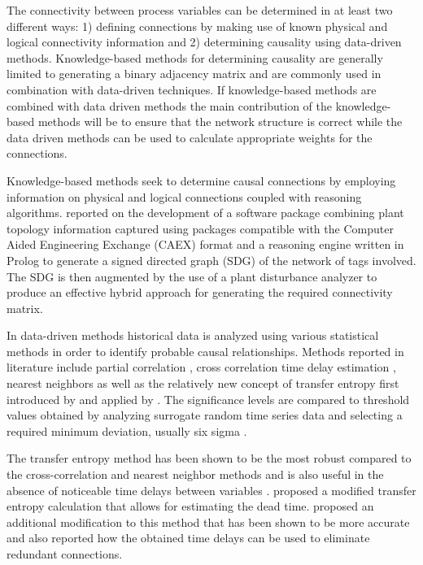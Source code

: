 \documentclass{article}
\begin{document}
The connectivity between process variables can be determined in at least two different ways: 1) defining connections by making use of known physical and logical connectivity information and 2) determining causality using data-driven methods.
Knowledge-based methods for determining causality are generally limited to generating a binary adjacency matrix and are commonly used in combination with data-driven techniques.
If knowledge-based methods are combined with data driven methods the main contribution of the knowledge-based methods will be to ensure that the network structure is correct while the data driven methods can be used to calculate appropriate weights for the connections.

Knowledge-based methods seek to determine causal connections by employing information on physical and logical connections coupled with reasoning algorithms.
\citet{Yim2006} reported on the development of a software package combining plant topology information captured using packages compatible with the Computer Aided Engineering Exchange (CAEX) format and a reasoning engine written in Prolog to generate a signed directed graph (SDG) of the network of tags involved.
The SDG is then augmented by the use of a plant disturbance analyzer to produce an effective hybrid approach for generating the required connectivity matrix.

In data-driven methods historical data is analyzed using various statistical methods in order to identify probable causal relationships. Methods reported in literature include partial correlation \citep{Farenzena2009}, cross correlation time delay estimation \citep{Bauer2008}, nearest neighbors \citep{Bauer2005} as well as the relatively new concept of transfer entropy first introduced by \citet{Schreiber2000} and applied by \citet{Bauer2007}.
The significance levels are compared to threshold values obtained by analyzing surrogate random time series data and selecting a required minimum deviation, usually six sigma \citep{Bauer2005}.

The transfer entropy method has been shown to be the most robust compared to the cross-correlation and nearest neighbor methods and is also useful in the absence of noticeable time delays between variables \citep{Bauer2005}.
\citet{Bauer2005} proposed a modified transfer entropy calculation that allows for estimating the dead time.
\citet{Shu2013} proposed an additional modification to this method that has been shown to be more accurate and also reported how the obtained time delays can be used to eliminate redundant connections.
\end{document}
